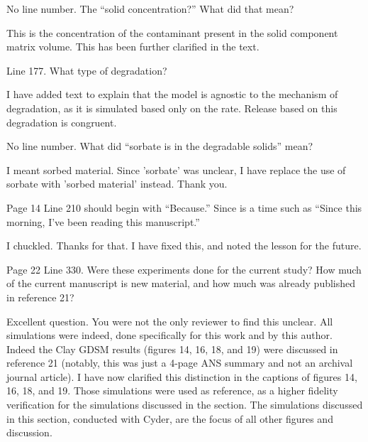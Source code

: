 \documentclass[answers,12pt]{exam}
\begin{document}
\begin{questions}
\question No line number. The ``solid concentration?'' What did that mean?
\begin{solution}
This is the concentration of the contaminant present in the solid component 
        matrix volume. This has been further clarified in the text.
\end{solution}
 

\question Line 177. What type of degradation?
\begin{solution}
        I have added text to explain that the model is agnostic to the 
        mechanism of degradation, as it is simulated based only on the rate.  
        Release based on this degradation is congruent.
\end{solution}

 

\question No line number. What did ``sorbate is in the degradable solids'' 
mean?
\begin{solution}
I meant sorbed material. Since 'sorbate' was unclear, I have replace the use of 
        sorbate with 'sorbed material' instead. Thank you.
\end{solution}
 

\question Page 14 Line 210 should begin with ``Because.'' Since is a time such 
as ``Since this morning, I've been reading this manuscript.''
\begin{solution}
I chuckled. Thanks for that. I have fixed this, and noted the lesson for the 
future.  \end{solution}

 

\question Page 22 Line 330. Were these experiments done for the current study? 
How much of the current manuscript is new material, and how much was already 
published in reference 21?
\begin{solution}
Excellent question. You were not the only reviewer to find this unclear. All 
        simulations were indeed, done specifically for this work and by this 
        author. Indeed the Clay GDSM results (figures 14, 16, 18, and 19) were 
        discussed in reference 21 (notably, this was just a 4-page ANS summary 
        and not an archival journal article).
        I have now clarified this distinction in the captions of figures 14, 
        16, 18, and 19. Those simulations were used as reference, as a higher 
        fidelity verification for the simulations discussed in the section. The 
        simulations discussed in this section, conducted with Cyder, are the 
focus of all other figures and discussion.  \end{solution}


\end{questions}
\end{document}
